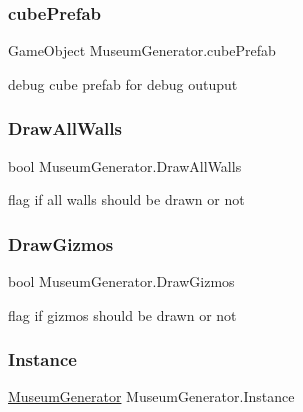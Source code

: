 \subsubsection{\texorpdfstring{cube\+Prefab}{cubePrefab}}
{\footnotesize\ttfamily Game\+Object Museum\+Generator.\+cube\+Prefab}



debug cube prefab for debug outuput 

\mbox{\label{class_museum_generator_a3a354ad136bc8f11fce23708625ccfde}} 
\subsubsection{\texorpdfstring{Draw\+All\+Walls}{DrawAllWalls}}
{\footnotesize\ttfamily bool Museum\+Generator.\+Draw\+All\+Walls}



flag if all walls should be drawn or not 

\mbox{\label{class_museum_generator_a102f8361f66eb629d3ad5c9951616b42}} 
\subsubsection{\texorpdfstring{Draw\+Gizmos}{DrawGizmos}}
{\footnotesize\ttfamily bool Museum\+Generator.\+Draw\+Gizmos}



flag if gizmos should be drawn or not 

\mbox{\label{class_museum_generator_ab3655c1b58520b049e4ca4f80744180a}} 
\subsubsection{\texorpdfstring{Instance}{Instance}}
{\footnotesize\ttfamily \mbox{\hyperlink{class_museum_generator}{Museum\+Generator}} Museum\+Generator.\+Instance\hspace{0.3cm}{\ttfamily [static]}}



